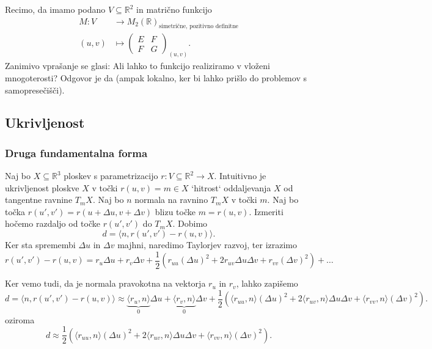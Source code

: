Recimo, da imamo podano $V \subseteq  \mathbb{R}^2$ in matrično funkcijo \begin{align*}
  M: V &\longrightarrow M_2(\mathbb{R})_\text{simetrične, pozitivno definitne}  \\
  (u,v) &\longmapsto \begin{pmatrix}
  E & F \\
  F & G
  \end{pmatrix}_{(u,v)}.
\end{align*} 
Zanimivo vprašanje se glasi: Ali lahko to funkcijo realiziramo v vloženi mnogoterosti? Odgovor je da (ampak lokalno, ker bi lahko prišlo do problemov s samopresečišči).

\subsection{Ukrivljenost}

\subsubsection{Druga fundamentalna forma}

Naj bo $X \subseteq \mathbb{R}^3$ ploskev s parametrizacijo $r: V \subseteq \mathbb{R}^2 \to  X$.
Intuitivno je ukrivljenost ploskve $X$ v točki $r(u,v) = m \in X$ `hitrost` oddaljevanja $X$ od tangentne ravnine $T_{m}X$.
Naj bo $n$ normala na ravnino $T_{m}X$ v točki $m$. Naj bo točka $r(u', v') = r(u + \Delta u, v + \Delta v)$ blizu točke $m = r(u,v)$. Izmeriti hočemo razdaljo od točke $r(u', v')$ do $T_mX$.
Dobimo 
\begin{equation*} d = \langle n, r(u', v') - r(u,v) \rangle.\end{equation*}
Ker sta spremembi $\Delta u$ in $\Delta v$ majhni, naredimo Taylorjev razvoj, ter izrazimo 
\begin{equation*} r(u', v') - r(u,v) = r_u \Delta u + r_v \Delta v + \frac{1}{2} \left(r_{uu} (\Delta u)^2 + 2r_{uv} \Delta u \Delta v + r_{vv} (\Delta v)^2 \right) + \ldots \end{equation*}

Ker vemo tudi, da je normala pravokotna na vektorja $r_u$ in $r_v$, lahko zapišemo 
\begin{equation*} d = \langle n, r(u', v') - r(u,v) \rangle \approx \underbrace{\langle r_u, n \rangle}_0   \Delta u + \underbrace{\langle r_v, n \rangle}_0  \Delta v  
+ \frac{1}{2} \left( \langle r_{uu}, n \rangle (\Delta u)^2 +  2\langle r_{uv}, n \rangle \Delta u \Delta v + \langle r_{vv}, n \rangle (\Delta v)^2 \right).\end{equation*}
oziroma 
\begin{equation*} d \approx \frac{1}{2} \left( \langle r_{uu}, n \rangle (\Delta u)^2 +  2\langle r_{uv}, n \rangle \Delta u \Delta v + \langle r_{vv}, n \rangle (\Delta v)^2 \right). \end{equation*}

